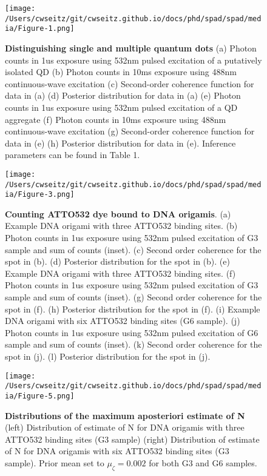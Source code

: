 \begin{figure}
\centering
\texttt{[image: /Users/cwseitz/git/cwseitz.github.io/docs/phd/spad/spad/media/Figure-1.png]}
\caption{\textbf{Distinguishing single and multiple quantum dots} (a) Photon counts in 1us exposure using 532nm pulsed excitation of a putatively isolated QD (b) Photon counts in 10ms exposure using 488nm continuous-wave excitation (c) Second-order coherence function for data in (a) (d) Posterior distribution for data in (a) (e) Photon counts in 1us exposure using 532nm pulsed excitation of a QD aggregate (f) Photon counts in 10ms exposure using 488nm continuous-wave excitation (g) Second-order coherence function for data in (e) (h) Posterior distribution for data in (e). Inference parameters can be found in Table 1.}
\label{fig:qdagg}
\end{figure}  

\clearpage
\begin{figure}
\centering
\texttt{[image: /Users/cwseitz/git/cwseitz.github.io/docs/phd/spad/spad/media/Figure-3.png]}
\caption{\textbf{Counting ATTO532 dye bound to DNA origamis}. (a) Example DNA origami with three ATTO532 binding sites. (b) Photon counts in 1us exposure using 532nm pulsed excitation of G3 sample and sum of counts (inset). (c) Second order coherence for the spot in (b). (d) Posterior distribution for the spot in (b). (e) Example DNA origami with three ATTO532 binding sites. (f) Photon counts in 1us exposure using 532nm pulsed excitation of G3 sample and sum of counts (inset). (g) Second order coherence for the spot in (f). (h) Posterior distribution for the spot in (f). (i) Example DNA origami with six ATTO532 binding sites (G6 sample). (j) Photon counts in 1us exposure using 532nm pulsed excitation of G6 sample and sum of counts (inset). (k) Second order coherence for the spot in (j). (l) Posterior distribution for the spot in (j).}
\label{fig:atto}
\end{figure}  

\clearpage
\begin{figure}
\centering
\texttt{[image: /Users/cwseitz/git/cwseitz.github.io/docs/phd/spad/spad/media/Figure-5.png]}
\caption{\textbf{Distributions of the maximum aposteriori estimate of N} (left) Distribution of estimate of N for DNA origamis with three ATTO532 binding sites (G3 sample) (right) Distribution of estimate of N for DNA origamis with six ATTO532 binding sites (G3 sample). Prior mean set to $\mu_\zeta=0.002$ for both G3 and G6 samples.}
\label{fig:atto2}
\end{figure}  

